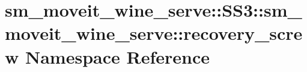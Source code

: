 \hypertarget{namespacesm__moveit__wine__serve_1_1SS3_1_1sm__moveit__wine__serve_1_1recovery__screw}{}\section{sm\+\_\+moveit\+\_\+wine\+\_\+serve\+:\+:S\+S3\+:\+:sm\+\_\+moveit\+\_\+wine\+\_\+serve\+:\+:recovery\+\_\+screw Namespace Reference}
\label{namespacesm__moveit__wine__serve_1_1SS3_1_1sm__moveit__wine__serve_1_1recovery__screw}
